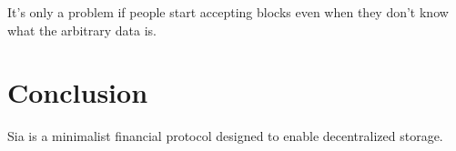 \documentclass[twocolumn]{article}
\begin{document}
It's only a problem if people start accepting blocks even when they don't know what the arbitrary data is.

\section{Conclusion}
Sia is a minimalist financial protocol designed to enable decentralized storage.



\end{document}
